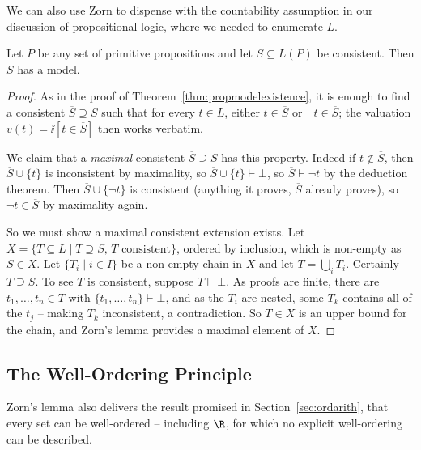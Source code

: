 We can also use Zorn to dispense with the countability assumption in our discussion of propositional logic, where we needed to enumerate $L$.

\begin{theorem}\label{thm:propmodelexistenceuncountable}
  Let $P$ be any set of primitive propositions and let $S \subseteq L(P)$ be consistent. Then $S$ has a model.
\end{theorem}
\begin{proof}
  As in the proof of Theorem~\ref{thm:propmodelexistence}, it is enough to find a consistent $\overline S \supseteq S$ such that for every $t \in L$, either $t \in \overline S$ or $\lnot t \in \overline S$; the valuation $v(t) = \ii[t \in \overline S]$ then works verbatim.

  We claim that a \emph{maximal} consistent $\overline S \supseteq S$ has this property. Indeed if $t \notin \overline S$, then $\overline S \cup \{t\}$ is inconsistent by maximality, so $\overline S \cup \{t\} \vdash \bot$, so $\overline S \vdash \lnot t$ by the deduction theorem. Then $\overline S \cup \{\lnot t\}$ is consistent (anything it proves, $\overline S$ already proves), so $\lnot t \in \overline S$ by maximality again.

  So we must show a maximal consistent extension exists. Let $X = \{T \subseteq L \mid T \supseteq S, \, T \text{ consistent}\}$, ordered by inclusion, which is non-empty as $S \in X$. Let $\{T_i \mid i \in I\}$ be a non-empty chain in $X$ and let $T = \bigcup_i T_i$. Certainly $T \supseteq S$. To see $T$ is consistent, suppose $T \vdash \bot$. As proofs are finite, there are $t_1, \dots, t_n \in T$ with $\{t_1, \dots, t_n\} \vdash \bot$, and as the $T_i$ are nested, some $T_k$ contains all of the $t_j$ -- making $T_k$ inconsistent, a contradiction. So $T \in X$ is an upper bound for the chain, and Zorn's lemma provides a maximal element of $X$.
\end{proof}

\subsection{The Well-Ordering Principle}

Zorn's lemma also delivers the result promised in Section~\ref{sec:ordarith}, that every set can be well-ordered -- including $\R$, for which no explicit well-ordering can be described.

